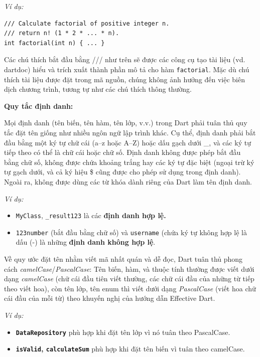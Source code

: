 \documentclass[../DoAn.tex]{subfiles}
\numberwithin{figure}{chapter}
\begin{document}
\textit{Ví dụ:} 
\begin{lstlisting}
/// Calculate factorial of positive integer n.
/// return n! (1 * 2 * ... * n).
int factorial(int n) { ... }    
\end{lstlisting}

Các chú thích bắt đầu bằng /// như trên sẽ được các công cụ tạo tài liệu (vd. dartdoc) hiểu và trích xuất thành phần mô tả cho hàm \texttt{factorial}. Mặc dù chú thích tài liệu được đặt trong mã nguồn, chúng không ảnh hưởng đến việc biên dịch chương trình, tương tự như các chú thích thông thường.

\textbf{Quy tắc định danh:}

Mọi định danh (tên biến, tên hàm, tên lớp, v.v.) trong Dart phải tuân thủ quy tắc đặt tên giống như nhiều ngôn ngữ lập trình khác. Cụ thể, định danh phải bắt đầu bằng một ký tự chữ cái (a–z hoặc A–Z) hoặc dấu gạch dưới {\_}, và các ký tự tiếp theo có thể là chữ cái hoặc chữ số. Định danh không được phép bắt đầu bằng chữ số, không được chứa khoảng trắng hay các ký tự đặc biệt (ngoại trừ ký tự gạch dưới, và cả ký hiệu {\$} cũng được cho phép sử dụng trong định danh). Ngoài ra, không được dùng các từ khóa dành riêng của Dart làm tên định danh. 

\textit{Ví dụ:} 
\begin{itemize}
    \item \texttt{MyClass}, \texttt{{\_}result123} là các \textbf{định danh hợp lệ.} 
    \item \texttt{123number} (bắt đầu bằng chữ số) và \texttt{username} (chứa ký tự không hợp lệ là dấu (-) là những \textbf{định danh không hợp lệ}.
\end{itemize}

Về quy ước đặt tên nhằm viết mã nhất quán và dễ đọc, Dart tuân thủ phong cách \textit{camelCase}/\textit{PascalCase}: Tên biến, hàm, và thuộc tính thường được viết dưới dạng \textit{camelCase} (chữ cái đầu tiên viết thường, các chữ cái đầu của những từ tiếp theo viết hoa), còn tên lớp, tên enum thì viết dưới dạng \textit{PascalCase} (viết hoa chữ cái đầu của mỗi từ) theo khuyến nghị của hướng dẫn Effective Dart. 

\textit{Ví dụ:} 
\begin{itemize}
    \item \textbf{\texttt{DataRepository}} phù hợp khi đặt tên lớp vì nó tuân theo PascalCase. 
    \item \textbf{\texttt{isValid}, \texttt{calculateSum}} phù hợp khi đặt tên biến vì tuân theo camelCase.
\end{itemize}
\end{document}

